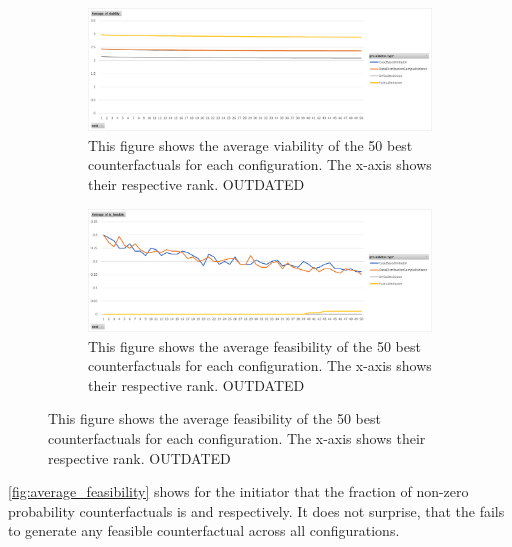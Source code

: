 \documentclass[./../../paper.tex]{subfiles}
\begin{document}
\begin{figure}
    \centering
    \begin{subfigure}[c]{0.99\textwidth}
        \centering
        \includegraphics[width=\textwidth]{figures/plots/average_viability.png}
        \caption{This figure shows the average viability of the 50 best counterfactuals for each configuration. The x-axis shows their respective rank. OUTDATED}
        \label{fig:average_viability}
    \end{subfigure}
    \begin{subfigure}[c]{0.99\textwidth}
        \centering
        \includegraphics[width=\textwidth]{figures/plots/average_feasibility.png}
        \caption{This figure shows the average feasibility of the 50 best counterfactuals for each configuration. The x-axis shows their respective rank. OUTDATED}
        \label{fig:average_feasibility}
    \end{subfigure}
\end{figure}

\noindent \autoref{fig:average_feasibility} shows for the  initiator that the fraction of non-zero probability counterfactuals is  and  respectively.  It does not surprise, that the  fails to generate any feasible counterfactual across all configurations.
\end{document}

